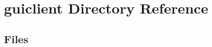 \section{guiclient Directory Reference}
\label{dir_f3f251c11bab830ba5b07d18edfbef77}
\subsection*{Files}
\begin{DoxyCompactItemize}
\end{DoxyCompactItemize}
